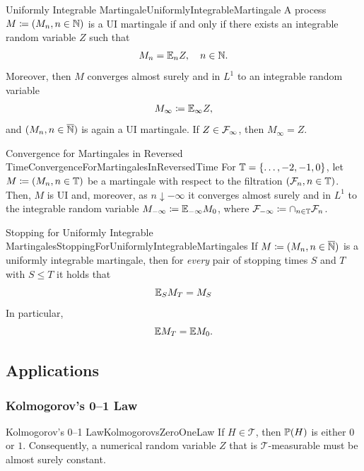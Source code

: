 \begin{thm}{Uniformly Integrable Martingale}{UniformlyIntegrableMartingale}
	A process \(M \coloneqq (M_n, n \in \mathbb{N})\) is a UI martingale if and only if there exists an integrable random variable \(Z\) such that
	\begin{equation}\label{eq:UIMartingaleDef}
		M_n = \mathbb{E}_n Z, \quad n \in \mathbb{N}.
	\end{equation}
	Moreover, then \(M\) converges almost surely and in \(L^1\) to an integrable random variable
	\begin{equation}\label{eq:MartingaleLimit}
		M_\infty \coloneqq \mathbb{E}_\infty Z,
	\end{equation}
	and \((M_n, n \in \overline{\mathbb{N}})\) is again a UI martingale. If \(Z \in \mathcal{F}_\infty\), then \(M_\infty = Z\).
\end{thm}

\begin{thm}{Convergence for Martingales in Reversed Time}{ConvergenceForMartingalesInReversedTime}
	For \(\mathbb{T} = \{\dots, -2, -1, 0\}\), let \(M \coloneqq (M_n, n \in \mathbb{T})\) be a martingale with respect to the filtration \((\mathcal{F}_n, n \in \mathbb{T})\). Then, \(M\) is UI and, moreover, as \(n \downarrow -\infty\) it converges almost surely and in \(L^1\) to the integrable random variable \(M_{-\infty} \coloneqq \mathbb{E}_{-\infty} M_0\), where \(\mathcal{F}_{-\infty} \coloneqq \cap_{n \in \mathbb{T}} \mathcal{F}_n\).
\end{thm}

\begin{thm}{Stopping for Uniformly Integrable Martingales}{StoppingForUniformlyIntegrableMartingales}
	If \(M \coloneqq (M_n, n \in \overline{\mathbb{N}})\) is a uniformly integrable martingale, then for \emph{every} pair of stopping times \(S\) and \(T\) with \(S \le T\) it holds that
	\begin{equation*}
		\mathbb{E}_S M_T = M_S
	\end{equation*}
	In particular,
	\begin{equation*}
		\mathbb{E} M_T = \mathbb{E} M_0.
	\end{equation*}
\end{thm}

\subsection{Applications}

\subsubsection{Kolmogorov's 0--1 Law}
\begin{thm}{Kolmogorov's 0--1 Law}{KolmogorovsZeroOneLaw}
	If \(H \in \mathcal{T}\), then \(\mathbb{P}(H)\) is either \(0\) or \(1\). Consequently, a numerical random variable \(Z\) that is \(\mathcal{T}\)-measurable must be almost surely constant.
\end{thm}

